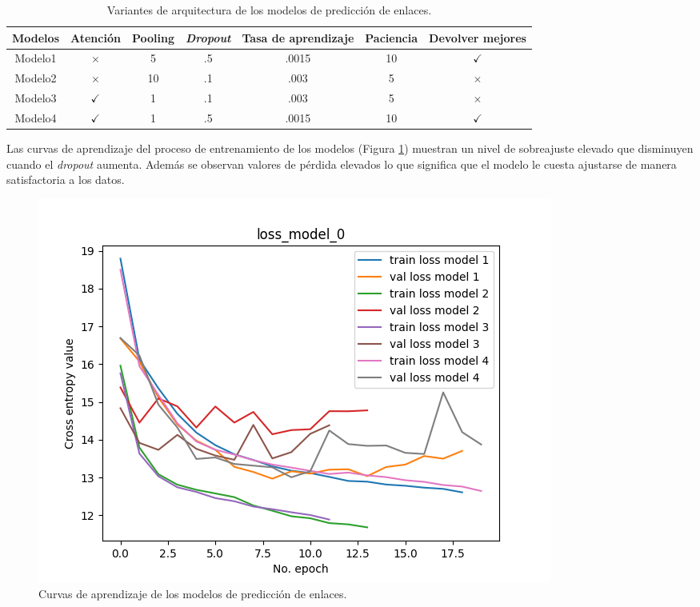 \begin{table}[h!]
	\begin{center}
		\begin{tabular}{|c|c|c|c|c|c|c|} \hline
		Modelos  & Atención      & Pooling  & \emph{Dropout}   & Tasa de aprendizaje & Paciencia & Devolver mejores     \\ \hline
		Modelo1	 & $\times$	     &  5       & .5               & .0015               & 10	      & $\checkmark$        \\ \hline
		Modelo2	 & $\times$	 	 & 10       & .1               & .003                & 5	      & $\times$            \\ \hline
		Modelo3	 & $\checkmark$	 &  1       & .1               & .003                & 5	      & $\times$            \\ \hline
		Modelo4	 & $\checkmark$	 &  1       & .5               & .0015               & 10	      & $\checkmark$        \\ \hline
		\end{tabular}
	\caption{Variantes de arquitectura de los modelos de predicción de enlaces.}\label{table:link_predictor_architecture_table}
	\end{center}
\end{table}

Las curvas de aprendizaje del proceso de entrenamiento de los modelos (Figura \ref{fig:link_prediction_model_loss}) 
muestran un nivel de sobreajuste 
elevado que disminuyen cuando el \emph{dropout} aumenta. Además se observan valores de pérdida elevados lo que significa 
que el modelo le cuesta ajustarse de manera satisfactoria a los datos.

\begin{figure}[h!]
	\begin{center}
		\includegraphics[scale=.7]{Graphics/persuassive_essays_all_linked_link_prediction_loss_model_1.png}
	    \caption{Curvas de aprendizaje de los modelos de predicción de enlaces.}\label{fig:link_prediction_model_loss}
	\end{center}
\end{figure}

